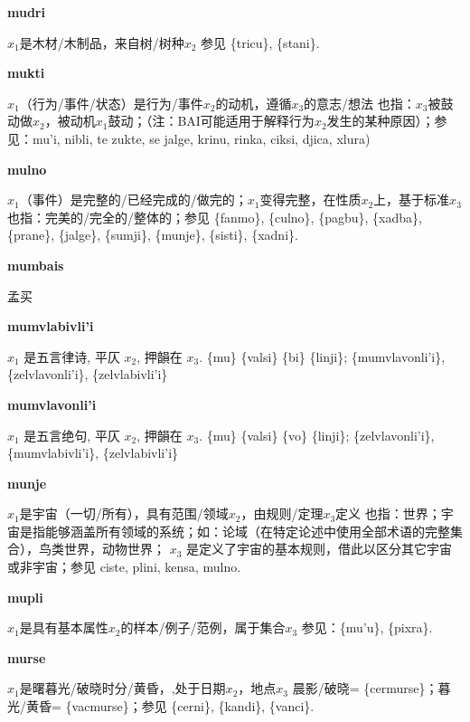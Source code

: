 \documentclass[notitlepage,twocolumn,a4paper,10pt]{book}
\begin{document}
{\sffamily\bfseries mudri}\enspace {\ttfamily\bfseries[mud]}  $x_1$是木材\slash{}木制品，来自树\slash{}树种$x_2$ \textemdash{} 参见 \{tricu\}, \{stani\}.

{\sffamily\bfseries mukti}\enspace {\ttfamily\bfseries[muk     mu'i]}  $x_1$（行为\slash{}事件\slash{}状态）是行为\slash{}事件$x_2$的动机，遵循$x_3$的意志\slash{}想法 \textemdash{} 也指：$x_3$被鼓动做$x_2$，被动机$x_1$鼓动；（注：BAI可能适用于解释行为$x_2$发生的某种原因）；参见：{mu'i}, {nibli}, te {zukte}, se {jalge}, {krinu}, {rinka}, {ciksi}, {djica}, {xlura})

{\sffamily\bfseries mulno}\enspace {\ttfamily\bfseries[mul     mu'o]}  $x_1$（事件）是完整的\slash{}已经完成的\slash{}做完的；$x_1$变得完整，在性质$x_2$上，基于标准$x_3$ \textemdash{} 也指：完美的\slash{}完全的\slash{}整体的；参见 \{fanmo\}, \{culno\}, \{pagbu\}, \{xadba\}, \{prane\}, \{jalge\}, \{sumji\}, \{munje\}, \{sisti\}, \{xadni\}.

{\sffamily\bfseries mumbais} 孟买

{\sffamily\bfseries mumvlabivli'i} $x_1$ 是五言律诗, 平仄 $x_2$, 押韻在 $x_3$. \textemdash{} \{mu\} \{valsi\} \{bi\} \{linji\}; \{mumvlavonli'i\}, \{zelvlavonli'i\}, \{zelvlabivli'i\}

{\sffamily\bfseries mumvlavonli'i} $x_1$ 是五言绝句, 平仄 $x_2$, 押韻在 $x_3$. \textemdash{} \{mu\} \{valsi\} \{vo\} \{linji\}; \{zelvlavonli'i\}, \{mumvlabivli'i\}, \{zelvlabivli'i\}

{\sffamily\bfseries munje}\enspace {\ttfamily\bfseries[muj     mu'e]}  $x_1$是宇宙（一切\slash{}所有），具有范围\slash{}领域$x_2$，由规则\slash{}定理$x_3$定义 \textemdash{} 也指：世界；宇宙是指能够涵盖所有领域的系统；如：论域（在特定论述中使用全部术语的完整集合），鸟类世界，动物世界； $x_3$ 是定义了宇宙的基本规则，借此以区分其它宇宙或非宇宙；参见 {ciste}, {plini}, {kensa}, {mulno}.

{\sffamily\bfseries mupli}\enspace {\ttfamily\bfseries[mup]}  $x_1$是具有基本属性$x_2$的样本\slash{}例子\slash{}范例，属于集合$x_3$ \textemdash{} 参见：\{mu'u\}, \{pixra\}.

{\sffamily\bfseries murse} $x_1$是曙暮光\slash{}破晓时分\slash{}黄昏，,处于日期$x_2$，地点$x_3$ \textemdash{} 晨影\slash{}破晓= \{cermurse\}；暮光\slash{}黄昏= \{vacmurse\}；参见 \{cerni\}, \{kandi\}, \{vanci\}.
\end{document}
